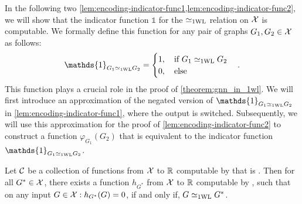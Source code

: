 In the following two \cref{lem:encoding-indicator-func1,lem:encoding-indicator-func2}, we will show that the indicator function $\mathds{1}$ for the $\simeq_{\text{1WL}}$ relation on $\mathcal{X}$ is \wlnn computable. We formally define this function for any pair of graphs $G_1, G_2 \in \mathcal{X}$ as follows:
\begin{equation*}
    \mathds{1}_{G_1 \wliso G_2} = \begin{cases}
        1, \quad \text{if $G_1 \wliso G_2$}\\
        0, \quad \text{else}
    \end{cases}.
\end{equation*}
This function plays a crucial role in the proof of \cref{theorem:gnn_in_1wl}. We will first introduce an approximation of the negated version of $\mathds{1}_{G_1 \wliso G_2}$ in \cref{lem:encoding-indicator-func1}, where the output is switched. Subsequently, we will use this approximation for the proof of \cref{lem:encoding-indicator-func2} to construct a function $\varphi_{G_1}(G_2)$ that is equivalent to the indicator function $\mathds{1}_{G_1 \wliso G_2}$.

\begin{lemma}\label{lem:encoding-indicator-func1}
    Let $\mathcal{C}$ be a collection of functions from $\mathcal{X}$ to $\mathbb{R}$ computable by \wlnn that is \wldisc. Then for all $G^* \in \mathcal{X}$, there exists a function $h_{G^*}$ from $\mathcal{X}$ to $\mathbb{R}$ computable by \wlnn, such that on any input $G \in \mathcal{X}: h_{G^*}(G) = 0$, if and only if, $G \simeq_{\text{1WL}} G^*$.
\end{lemma}

